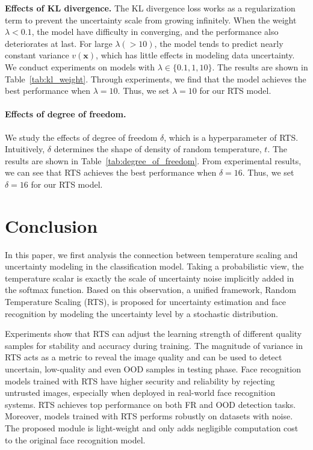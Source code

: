 \documentclass[letterpaper]{article} %
\begin{document}
\textbf{Effects of KL divergence.} The KL divergence loss works as a regularization term to prevent the uncertainty scale from growing infinitely. When the weight $\lambda < 0.1$, the model have difficulty in converging, and the performance also deteriorates at last.
For large $\lambda (>10)$, the model tends to predict nearly constant variance $v(\bm{x})$, which has little effects in modeling data uncertainty.
We conduct experiments on models with $\lambda \in \{0.1, 1, 10\}$. The results are shown in Table~\ref{tab:kl_weight}.
Through experiments, we find that the model achieves the best performance when $\lambda = 10$. Thus, we set $\lambda = 10$ for our RTS model.

\paragraph{Effects of degree of freedom.} We study the effects of degree of freedom $\delta$, which is a hyperparameter of RTS. Intuitively, $\delta$ determines the shape of density of random temperature, $t$. The results are shown in Table~\ref{tab:degree_of_freedom}. From experimental results, we can see that RTS achieves the best performance when $\delta = 16$. Thus, we set $\delta = 16$ for our RTS model.



\vspace{-4.12mm}
\section{Conclusion}
\label{sec:conclusion}

In this paper, we first analysis the connection between temperature scaling and uncertainty modeling in the classification model. Taking a probabilistic view, the temperature scalar is exactly the scale of uncertainty noise implicitly added in the softmax function. Based on this observation, a unified framework, Random Temperature Scaling (RTS), is proposed for uncertainty estimation and face recognition by modeling the uncertainty level by a stochastic distribution.

Experiments show that RTS can adjust the learning strength of different quality samples for stability and accuracy during training. The magnitude of variance in RTS acts as a metric to reveal the image quality and can be used to detect uncertain, low-quality and even OOD samples in testing phase.
Face recognition models trained with RTS have higher security and reliability by rejecting untrusted images, especially when deployed in real-world face recognition systems. RTS achieves top performance on both FR and OOD detection tasks. Moreover, models trained with RTS performs robustly on datasets with noise. The proposed module is light-weight and only adds negligible computation cost to the original face recognition model.
\end{document}
